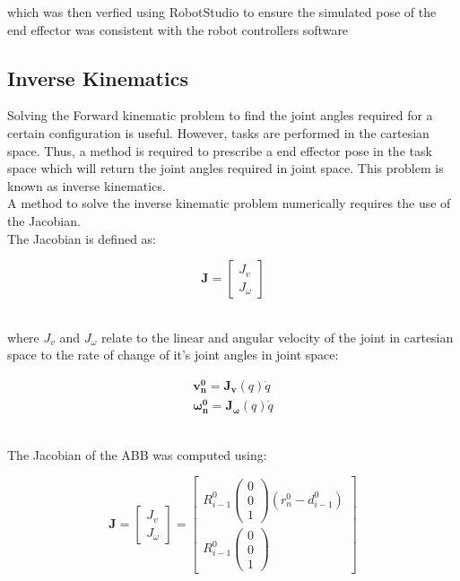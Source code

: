 \documentclass{UoNMCHA}
\numberwithin{equation}{section}
\begin{document}
which was then verfied using RobotStudio to ensure the simulated pose of the end effector was consistent with the robot controllers software

\subsection{Inverse Kinematics}

Solving the Forward kinematic problem to find the joint angles required for a certain configuration is useful. However, tasks are performed in the cartesian space. Thus, a method is required to prescribe a end effector pose in the task space which will return the joint angles required in joint space. This problem is known as inverse kinematics.\\

A method to solve the inverse kinematic problem numerically requires the use of the Jacobian.\\

The Jacobian is defined as:\

\begin{equation*}
\mathbf{J} =
\begin{bmatrix}
J_{v} \\ J_{\omega}  
\end{bmatrix}
\end{equation*}\

where $J_{v}$ and $J_{\omega}$ relate to the linear and angular velocity of the joint in cartesian space to the rate of change of it's joint angles in joint space:\

\begin{equation*}
\begin{split}
\mathbf{v^{0}_{n}} = \mathbf{J_{v}}(q)\dot{q} \\
\mathbf{\omega^{0}_{n}} = \mathbf{J_{\omega}}(q)\dot{q} 
\end{split}
\end{equation*}\

The Jacobian of the ABB was computed using:\

\begin{equation*}
\mathbf{J} =
\begin{bmatrix}
J_{v} \\ J_{\omega}  
\end{bmatrix} = 
\begin{bmatrix}
R^{0}_{i-1} \begin{pmatrix}
0 \\0\\1 
\end{pmatrix}(r^0_n - d^0_{i-1})\\
 R^{0}_{i-1} \begin{pmatrix}
 0 \\0\\1 
 \end{pmatrix}  
\end{bmatrix}
\end{equation*}\
\end{document}
